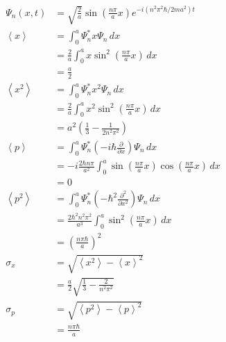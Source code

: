 \documentclass{article}
\newcommand{\ev}[1]{\left< #1 \right>}
\begin{document}
\begin{align*}
  \Psi_n(x, t) & = \sqrt{\frac{2}{a}} \sin \left( \frac{n \pi}{a} x \right) e^{-i (n^2 \pi^2 \hbar / 2 m a^2) t}                           \\
  \ev{x}       & = \int_0^a \Psi_n^* x \Psi_n \,d x                                                                                        \\
               & = \frac{2}{a} \int_0^a x \sin^2 \left( \frac{n \pi}{a} x \right) \,d x                                                    \\
               & = \frac{a}{2}                                                                                                             \\
  \ev{x^2}     & = \int_0^a \Psi_n^* x^2 \Psi_n \,d x                                                                                      \\
               & = \frac{2}{a} \int_0^a x^2 \sin^2 \left( \frac{n \pi}{a} x \right) \,d x                                                  \\
               & = a^2 \left( \frac{1}{3} - \frac{1}{2 n^2 \pi^2} \right)                                                                  \\
  \ev{p}       & = \int_0^a \Psi_n^* \left( -i \hbar \frac{\partial}{\partial x} \right) \Psi_n \,d x                                      \\
               & = -i \frac{2 \hbar n \pi}{a^2} \int_0^a \sin \left( \frac{n \pi}{a} x \right) \cos \left( \frac{n \pi}{a} x \right) \,d x \\
               & = 0                                                                                                                       \\
  \ev{p^2}     & = \int_0^a \Psi_n^* \left( -\hbar^2 \frac{\partial^2}{\partial x^2} \right) \Psi_n \,d x                                  \\
               & = \frac{2 \hbar^2 n^2 \pi^2}{a^3} \int_0^a \sin^2 \left( \frac{n \pi}{a} x \right) \,d x                                  \\
               & = \left( \frac{n \pi \hbar}{a} \right)^2                                                                                  \\
  \sigma_x     & = \sqrt{\ev{x^2} - \ev{x}^2}                                                                                              \\
               & = \frac{a}{2} \sqrt{\frac{1}{3} - \frac{2}{n^2 \pi^2}}                                                                    \\
  \sigma_p     & = \sqrt{\ev{p^2} - \ev{p}^2}                                                                                              \\
               & = \frac{n \pi \hbar}{a}
\end{align*}
\end{document}
